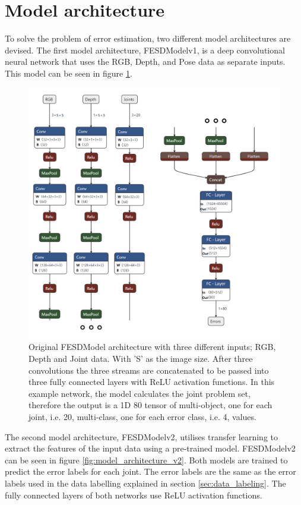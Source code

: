 \section{Model architecture}
\label{sec:model_architecture}

To solve the problem of error estimation, two different model architectures are devised. The first model architecture, FESDModelv1, is a deep convolutional neural network that uses the RGB, Depth, and Pose data as separate inputs. This model can be seen in figure \ref{fig:model_architecture_v1}.

\begin{figure}[ht]
  \centering
  \includegraphics[width=.8\linewidth]{figures/Model/FESD.png}
  \caption[FESDModel architecture version 1]{Original FESDModel architecture with three different inputs; RGB, Depth and Joint data. With 'S' as the image size. After three convolutions the three streams are concatenated to be passed into three fully connected layers with ReLU activation functions. In this example network, the model calculates the joint problem set, therefore the output is a 1D 80 tensor of multi-object, one for each joint, i.e. 20, multi-class, one for each error class, i.e. 4, values.}
  \label{fig:model_architecture_v1}
\end{figure}

The second model architecture, FESDModelv2, utilises transfer learning to extract the features of the input data using a pre-trained model. FESDModelv2 can be seen in figure \ref{fig:model_architecture_v2}. Both models are trained to predict the error labels for each joint. The error labels are the same as the error labels used in the data labelling explained in section \ref{sec:data_labeling}. The fully connected layers of both networks use ReLU activation functions.

